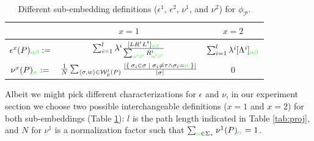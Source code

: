 \begin{table}[!t]
	\caption{Different sub-embedding definitions ($\epsilon^1$, $\epsilon^2$, $\nu^1$, and $\nu^2$) for $\phi_{\mathcal{P}}$.}\label{tab:embedstrat}
	\centering
	\begin{tabular}{c|c|c}
		\toprule
		& $x=1$ & $x=2$ \\
		\midrule
		$\epsilon^x(P)_{\color{green}\alpha\beta}:=$ & $\label{eq:epsilon}
		\sum_{i=1}^l{\lambda^i}\frac{[LR^iL^t]_{\color{green}\alpha\beta}}{\sum_{\color{green}\alpha'\beta'}R^i_{\color{green}\alpha'\beta'}}$ & $
		\sum_{i=1}^l\lambda^i[\Lambda^i]_{\color{green}\alpha\beta}$\\
		$\nu^x(P)_{\color{green}\alpha}:=$ & $\frac{1}{N}\sum_{\braket{\sigma,w}\in\mathcal{W}_p^l(P)}\frac{|\Set{\sigma_i\in\sigma|\sigma_i\neq\tau\wedge \sigma_i={\color{green}\alpha}}|}{|\sigma|}$ & $0$ \\
		\bottomrule
	\end{tabular}
\end{table}
Albeit we might pick different characterizations for $\epsilon$ and $\nu$, {in our experiment section} we choose two possible interchangeable definitions ($x=1$ and $x=2$) for both sub-embeddings (Table \ref{tab:embedstrat}): $l$ is the path length indicated in Table \ref{tab:proj}, and $N$ for $\nu^1$ is a normalization factor such that $\sum_{{\color{green}\alpha}\in\Sigma_\tau}\nu^1(P)_{\color{green}\alpha}=1$.  %



